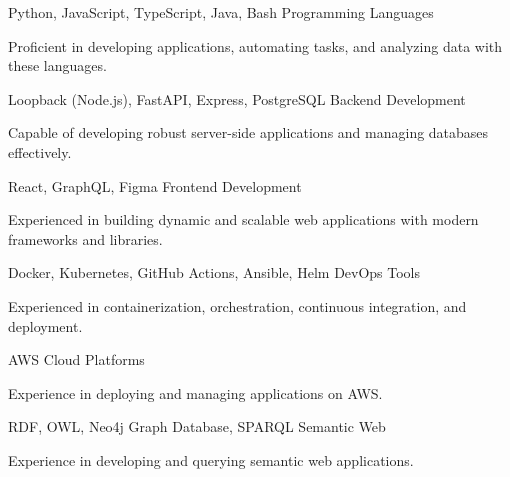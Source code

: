 \begin{cventries}
  \cventry
  {Python, JavaScript, TypeScript, Java, Bash}
  {Programming Languages}
  {}
  {}
  {
    \begin{cvitems}
      \item {Proficient in developing applications, automating tasks, and analyzing data with these languages.}
    \end{cvitems}
  }

  \cventry
  {Loopback (Node.js), FastAPI, Express, PostgreSQL}
  {Backend Development}
  {}
  {}
  {
    \begin{cvitems}
      \item{Capable of developing robust server-side applications and managing databases effectively.}
    \end{cvitems}
  }

  \cventry
  {React, GraphQL, Figma}
  {Frontend Development}
  {}
  {}
  {
    \begin{cvitems}
      \item {Experienced in building dynamic and scalable web applications with modern frameworks and libraries.}
    \end{cvitems}
  }

  \cventry
  {Docker, Kubernetes, GitHub Actions, Ansible, Helm}
  {DevOps Tools}
  {}
  {}
  {
    \begin{cvitems}
      \item {Experienced in containerization, orchestration, continuous integration, and deployment.}
    \end{cvitems}
  }

  \cventry
  {AWS}
  {Cloud Platforms}
  {}
  {}
  {
    \begin{cvitems}
      \item {Experience in deploying and managing applications on AWS.}
    \end{cvitems}
  }


  \cventry
  {RDF, OWL, Neo4j Graph Database, SPARQL}
  {Semantic Web}
  {}
  {}
  {
    \begin{cvitems}
      \item {Experience in developing and querying semantic web applications.}
    \end{cvitems}
  }

\end{cventries}